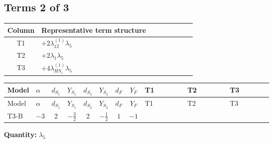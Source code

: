 \documentclass[8pt]{article}
\begin{document}
\begin{landscape}
\subsection*{Terms 2 of 3}
\begin{center}
\begin{tabular}{@{}c >{\raggedright\arraybackslash}p{0.82\linewidth}@{}}
\toprule
Column & Representative term structure \\
\midrule
T1 & \(\displaystyle +2 {\lambda_{12}^{(1)}} {\lambda_5}\) \\
\midrule
T2 & \(\displaystyle +2 {\lambda_1} {\lambda_5}\) \\
\midrule
T3 & \(\displaystyle +4 {\lambda_{HS_1}^{(1)}} {\lambda_5}\) \\
\midrule
\bottomrule
\end{tabular}
\end{center}
\smallskip
\tiny
\begin{longtable}{@{}llcccccc >{\raggedright\arraybackslash}p{0.21\linewidth} >{\raggedright\arraybackslash}p{0.21\linewidth} >{\raggedright\arraybackslash}p{0.21\linewidth}@{}}
\toprule
Model & $\alpha$ & $d_{S_1}$ & $Y_{S_1}$ & $d_{S_2}$ & $Y_{S_2}$ & $d_F$ & $Y_F$ & T1 & T2 & T3 \\
\midrule
\endfirsthead
\toprule
Model & $\alpha$ & $d_{S_1}$ & $Y_{S_1}$ & $d_{S_2}$ & $Y_{S_2}$ & $d_F$ & $Y_F$ & T1 & T2 & T3 \\
\midrule
\endhead
T3-B & $-3$ & $2$ & $-\frac{3}{2}$ & $2$ & $-\frac{1}{2}$ & $1$ & $-1$ & \scriptsize\adjustbox{max width=\linewidth}{$\begin{gathered} +2 {\lambda_{12}^{(1)}} {\lambda_5}\end{gathered}$} & \scriptsize\adjustbox{max width=\linewidth}{$\begin{gathered} +2 {\lambda_1} {\lambda_5}\end{gathered}$} & \scriptsize\adjustbox{max width=\linewidth}{$\begin{gathered} +4 {\lambda_{HS_1}^{(1)}} {\lambda_5}\end{gathered}$} \\
\midrule
\bottomrule
\end{longtable}
\clearpage
\noindent\textbf{Quantity: }$\lambda_5$\par\smallskip

\end{landscape}
\end{document}
